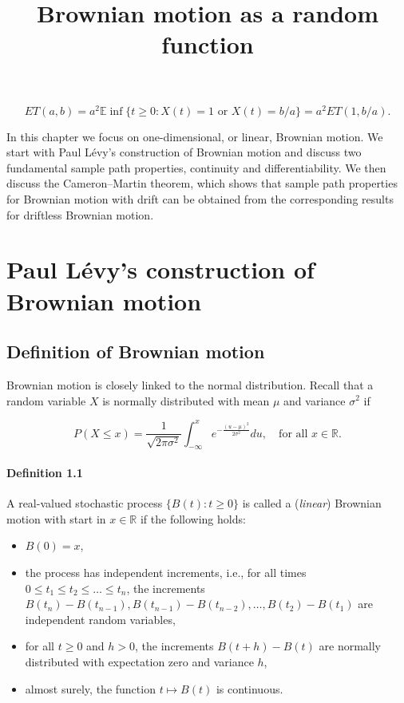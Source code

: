 \documentclass{article}
\begin{document}
\[
ET(a, b) = a^2 \mathbb{E} \inf \{t \geq 0 : X(t) = 1 \text{ or } X(t) = b/a\} = a^2 ET(1, b/a).
\]







\title{Brownian motion as a random function}
\maketitle

In this chapter we focus on one-dimensional, or linear, Brownian motion. We start with Paul Lévy's construction of Brownian motion and discuss two fundamental sample path properties, continuity and differentiability. We then discuss the Cameron–Martin theorem, which shows that sample path properties for Brownian motion with drift can be obtained from the corresponding results for driftless Brownian motion.

\section{Paul Lévy's construction of Brownian motion}

\subsection{Definition of Brownian motion}

Brownian motion is closely linked to the normal distribution. Recall that a random variable $X$ is normally distributed with mean $\mu$ and variance $\sigma^2$ if

\[
P(X \leq x) = \frac{1}{\sqrt{2\pi\sigma^2}} \int_{-\infty}^{x} e^{-\frac{(u-\mu)^2}{2\sigma^2}} du, \quad \text{for all } x \in \mathbb{R}.
\]

\paragraph{Definition 1.1} A real-valued stochastic process $\{B(t) : t \geq 0\}$ is called a (\textit{linear}) Brownian motion with start in $x \in \mathbb{R}$ if the following holds:
\begin{itemize}
    \item $B(0) = x$,
    \item the process has independent increments, i.e., for all times $0 \leq t_1 \leq t_2 \leq \dots \leq t_n$, the increments $B(t_n) - B(t_{n-1}), B(t_{n-1}) - B(t_{n-2}), \ldots, B(t_2) - B(t_1)$ are independent random variables,
    \item for all $t \geq 0$ and $h > 0$, the increments $B(t+h) - B(t)$ are normally distributed with expectation zero and variance $h$,
    \item almost surely, the function $t \mapsto B(t)$ is continuous.
\end{itemize}
\end{document}
